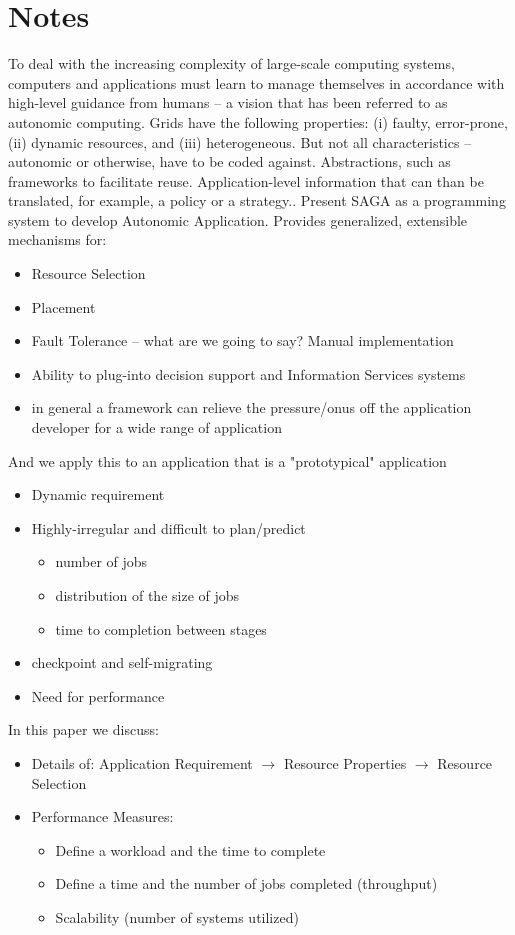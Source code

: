 \documentclass[conference,final]{IEEEtran}
\begin{document}
\section*{Notes}
To deal with the increasing complexity of large-scale computing
systems, computers and applications must learn to manage themselves in
accordance with high-level guidance from humans -- a vision that has
been referred to as autonomic computing.  Grids have the following
properties: (i) faulty, error-prone, (ii) dynamic resources, and (iii)
heterogeneous. But not all characteristics -- autonomic or otherwise,
have to be coded against.  Abstractions, such as frameworks to
facilitate reuse.  Application-level information that can than be
translated, for example, a policy or a strategy.. Present SAGA as a
programming system to develop Autonomic Application.  Provides
generalized, extensible mechanisms for:
\begin{itemize}
\item  Resource Selection
\item Placement
\item  Fault Tolerance -- what are we going to say? Manual implementation
\item Ability to plug-into decision support and Information Services
  systems
\item in general a framework can relieve the pressure/onus off the
  application developer for a wide range of application
\end{itemize}

And we apply this to an application that is a "prototypical"
application

\begin{itemize} 
\item Dynamic requirement
\item Highly-irregular and  difficult to plan/predict
\begin{itemize} 
  \item number of jobs
  \item distribution of the size of jobs
  \item time to completion between stages
\end{itemize} 
\item checkpoint and self-migrating 
\item Need for performance 
\end{itemize} 

In this paper we discuss:
\begin{itemize} 
\item Details of: Application Requirement $\rightarrow$ Resource Properties 
$\rightarrow$ Resource Selection
\item Performance Measures:
  \begin{itemize}
\item Define a workload and the time to complete 
\item Define a time and the number of jobs completed (throughput)
\item Scalability (number of systems utilized)
\end{itemize} 
\end{itemize} 
\end{document}
